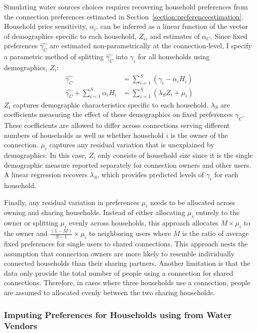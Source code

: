 \documentclass[12pt]{article}
\begin{document}
Simulating water sources choices requires recovering household preferences from the connection preferences estimated in Section~\ref{section:preferenceestimation}.  Household price sensitivity, $\alpha_i$, can be inferred as a linear function of the vector of demographics specific to each household, $Z_i$, and estimates of $\alpha_C$.  Since fixed preferences $\hat{\gamma_C}$ are estimated non-parametrically at the connection-level, I specify a parametric method of splitting $\hat{\gamma_C}$ into $\gamma_i$ for all households using demographics, $Z_i$:
\begin{align*}
\hat{\gamma_C}  		   		& =  \sum_{i=1}^{S} ( \gamma_i - \alpha_i H_{i} ) \\
\hat{\gamma_C} + \sum_{i=1}^{S}  \alpha_i H_{i}		& =  \sum_{i=1}^{S}  (\lambda_{S} Z_i + \mu_{i})  
\end{align*}
$Z_i$ captures demographic characteristics specific to each household.  $\lambda_{S}$ are coefficients measuring the effect of these demographics on fixed preferences $\gamma_C$.  These coefficients are allowed to differ across connections serving different numbers of households as well as whether household $i$ is the owner of the connection.  $\mu_{i}$ captures any residual variation that is unexplained by demographics.  In this case, $Z_i$ only consists of household size since it is the single demographic measure reported separately for connection owners and other users.  A linear regression recovers $\lambda_{S}$, which provides predicted levels of $\gamma_i$ for each household.  

Finally, any residual variation in preferences $\mu_{i}$ needs to be allocated across owning and sharing households.  Instead of either allocating $\mu_i$ entirely to the owner or splitting $\mu_{i}$ evenly across households, this approach allocates $M \times \mu_{i}$ to the owner and $\frac{(1-M)}{S-1} \times \mu_{i}$ to neighboring users where $M$ is the ratio of average fixed preferences for single users to shared connections.  This approach nests the assumption that connection owners are more likely to resemble individually connected households than their sharing partners.  Another limitation is that the data only provide the total number of people using a connection for shared connections.  Therefore, in cases where three households use a connection, people are assumed to allocated evenly between the two sharing households.

\subsubsection{Imputing Preferences for Households using from Water Vendors}
\end{document}
